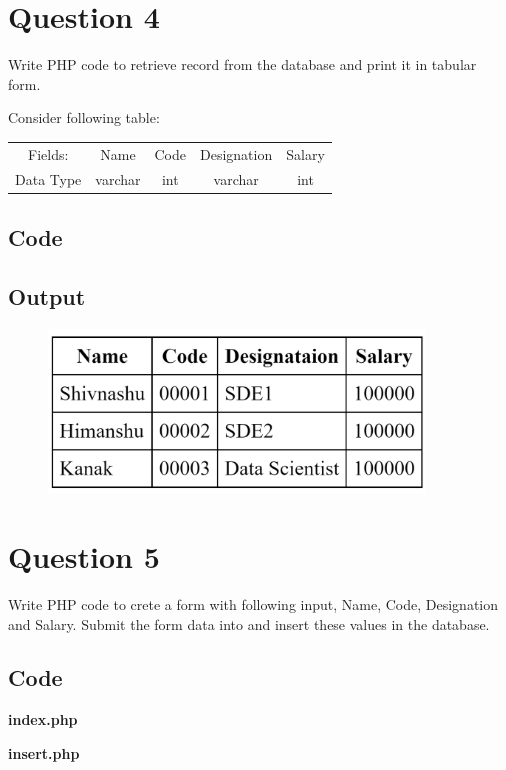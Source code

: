 \documentclass{article}
\begin{document}
\newpage
\section*{Question 4}
Write PHP code to retrieve record from the database and print it
in tabular form.

Consider following table:

\begin{tabular}{ | c | c | c |  c | c | }
  \hline
  Fields:   & Name    & Code & Designation & Salary \\
  Data Type & varchar & int  & varchar     & int    \\
  \hline
\end{tabular}

\subsection*{Code}

\subsection*{Output}
\begin{figure}[H]
  \centering
  \includegraphics[width=10cm]{4/out.png}
\end{figure}

\newpage
\section*{Question 5}
Write PHP code to crete a form with following input, Name, Code, Designation and Salary.
Submit the form data into and insert these values in the database.

\subsection*{Code}
\textbf{index.php}

\textbf{insert.php}

\newpage
\end{document}
